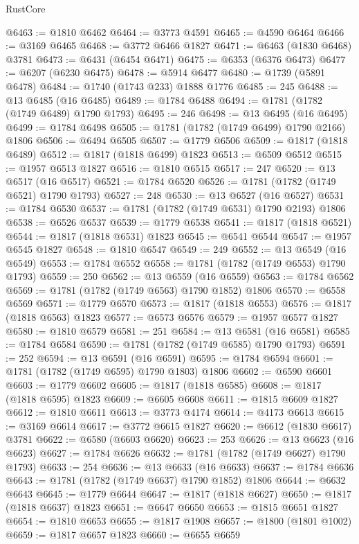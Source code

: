 \begin{lexlean}{RustCore}
\begin{coremodule}
@6463 := @1810 @6462
@6464 := @3773 @4591
@6465 := @4590 @6464
@6466 := @3169 @6465
@6468 := @3772 @6466 @1827
@6471 := @6463 (@1830 @6468) @3781
@6473 := @6431 (@6454 @6471)
@6475 := @6353 (@6376 @6473)
@6477 := @6207 (@6230 @6475)
@6478 := @5914 @6477
@6480 := @1739 (@5891 @6478)
@6484 := @1740 (@1743 @233) @1888 @1776
@6485 := 245
@6488 := @13 @6485 (@16 @6485)
@6489 := @1784 @6488
@6494 := @1781 (@1782 (@1749 @6489) @1790 @1793)
@6495 := 246
@6498 := @13 @6495 (@16 @6495)
@6499 := @1784 @6498
@6505 := @1781 (@1782 (@1749 @6499) @1790 @2166) @1806
@6506 := @6494 @6505
@6507 := @1779 @6506
@6509 := @1817 (@1818 @6489)
@6512 := @1817 (@1818 @6499) @1823
@6513 := @6509 @6512
@6515 := @1957 @6513 @1827
@6516 := @1810 @6515
@6517 := 247
@6520 := @13 @6517 (@16 @6517)
@6521 := @1784 @6520
@6526 := @1781 (@1782 (@1749 @6521) @1790 @1793)
@6527 := 248
@6530 := @13 @6527 (@16 @6527)
@6531 := @1784 @6530
@6537 := @1781 (@1782 (@1749 @6531) @1790 @2193) @1806
@6538 := @6526 @6537
@6539 := @1779 @6538
@6541 := @1817 (@1818 @6521)
@6544 := @1817 (@1818 @6531) @1823
@6545 := @6541 @6544
@6547 := @1957 @6545 @1827
@6548 := @1810 @6547
@6549 := 249
@6552 := @13 @6549 (@16 @6549)
@6553 := @1784 @6552
@6558 := @1781 (@1782 (@1749 @6553) @1790 @1793)
@6559 := 250
@6562 := @13 @6559 (@16 @6559)
@6563 := @1784 @6562
@6569 := @1781 (@1782 (@1749 @6563) @1790 @1852) @1806
@6570 := @6558 @6569
@6571 := @1779 @6570
@6573 := @1817 (@1818 @6553)
@6576 := @1817 (@1818 @6563) @1823
@6577 := @6573 @6576
@6579 := @1957 @6577 @1827
@6580 := @1810 @6579
@6581 := 251
@6584 := @13 @6581 (@16 @6581)
@6585 := @1784 @6584
@6590 := @1781 (@1782 (@1749 @6585) @1790 @1793)
@6591 := 252
@6594 := @13 @6591 (@16 @6591)
@6595 := @1784 @6594
@6601 := @1781 (@1782 (@1749 @6595) @1790 @1803) @1806
@6602 := @6590 @6601
@6603 := @1779 @6602
@6605 := @1817 (@1818 @6585)
@6608 := @1817 (@1818 @6595) @1823
@6609 := @6605 @6608
@6611 := @1815 @6609 @1827
@6612 := @1810 @6611
@6613 := @3773 @4174
@6614 := @4173 @6613
@6615 := @3169 @6614
@6617 := @3772 @6615 @1827
@6620 := @6612 (@1830 @6617) @3781
@6622 := @6580 (@6603 @6620)
@6623 := 253
@6626 := @13 @6623 (@16 @6623)
@6627 := @1784 @6626
@6632 := @1781 (@1782 (@1749 @6627) @1790 @1793)
@6633 := 254
@6636 := @13 @6633 (@16 @6633)
@6637 := @1784 @6636
@6643 := @1781 (@1782 (@1749 @6637) @1790 @1852) @1806
@6644 := @6632 @6643
@6645 := @1779 @6644
@6647 := @1817 (@1818 @6627)
@6650 := @1817 (@1818 @6637) @1823
@6651 := @6647 @6650
@6653 := @1815 @6651 @1827
@6654 := @1810 @6653
@6655 := @1817 @1908
@6657 := @1800 (@1801 @1002)
@6659 := @1817 @6657 @1823
@6660 := @6655 @6659

\end{coremodule}
\end{lexlean}
